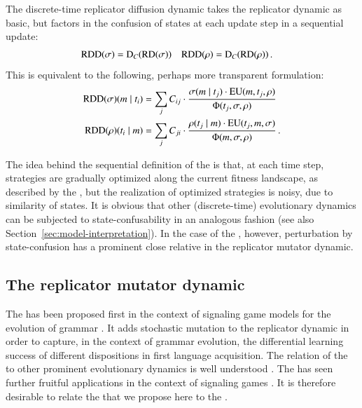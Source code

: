\documentclass[fleqn,reqno,10pt]{article}
\newcommand{\rd}{\acro{rd}} %
\newcommand{\rmd}{\acro{rmd}} %
\newcommand{\rdd}{\acro{rdd}} %
\newcommand{\RD}{\ensuremath{\mathrm{RD}}} %
\newcommand{\RDD}{\ensuremath{\mathrm{RDD}}} %
\newcommand{\Diff}{\ensuremath{\mathrm{D}}} %
\begin{document}
The discrete-time replicator diffusion dynamic takes the replicator
dynamic as basic, but factors in the confusion of states at each
update step in a sequential update:
\begin{align*}
  \RDD(\Sstrat) & = \Diff_C(\RD(\Sstrat)) &   \RDD(\Rstrat) & = \Diff_C(\RD(\Rstrat)) \,.
\end{align*}
This is equivalent to the following, perhaps more transparent
formulation:
\begin{align*}
  \RDD(\Sstrat)(\messg \probbar \state_i) & = \sum_{j} C_{ij} \cdot
  \frac{\Sstrat(\messg \probbar \state_j) \cdot
    \EU(\messg, \state_j,\Rstrat)}
  {\Phi(\state_j,\Sstrat, \Rstrat)} \\
    \RDD(\Rstrat)(\state_i \probbar \messg) & = \sum_{j} C_{ji} \cdot
  \frac{\Rstrat(\state_j \probbar \messg) \cdot
    \EU(\state_j, \messg,\Sstrat)} {\Phi(\messg,\Sstrat, \Rstrat)}  \,.
\end{align*}

The idea behind the sequential definition of the \rdd is that, at each
time step, strategies are gradually optimized along the current
fitness landscape, as described by the \rd, but the realization of
optimized strategies is noisy, due to similarity of states. It is
obvious that other (discrete-time) evolutionary dynamics can be
subjected to state-confusability in an analogous fashion (see also
Section~\ref{sec:model-interpretation}). In the case of the \rd,
however, perturbation by state-confusion has a prominent close
relative in the replicator mutator dynamic.

\subsection{The replicator mutator dynamic}
\label{sec:repl-mutat-dynam}

The \rmd has been proposed first in the context of signaling game
models for the evolution of grammar
\citep[e.g.][]{KomarovaNiyogi2001:The-Evolutionar,NowakKomarova2001:Evolution-of-Un}. It
adds stochastic mutation to the replicator dynamic in order to capture, in
the context of grammar evolution, the differential learning success of
different dispositions in first language acquisition. The relation of
the \rmd to other prominent evolutionary dynamics is well understood
\citep{PageNowak2002:Unifying-Evolut}. The \rmd has seen further
fruitful applications in the context of signaling games
\citep[e.g.][]{HutteggerSkyrms2010:Evolutionary-Dy}. It
is therefore desirable to relate the \rdd that we propose here to the
\rmd.
\end{document}
